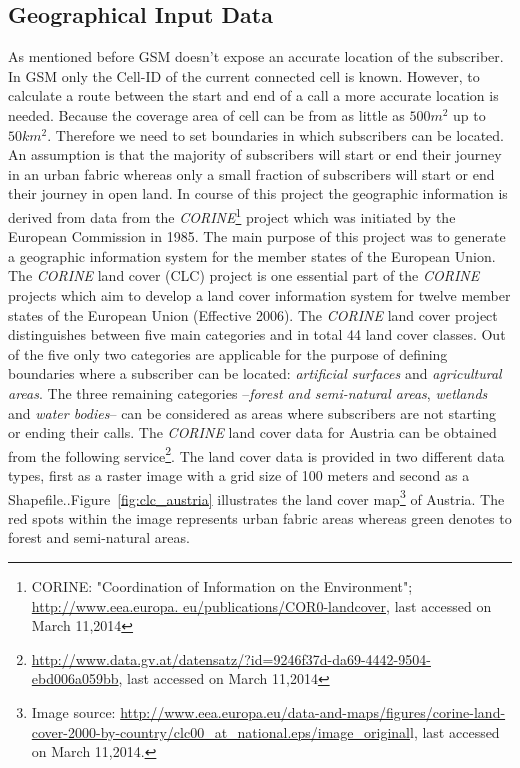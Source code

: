 \subsection{Geographical Input Data}
As mentioned before GSM doesn't expose an accurate location of the subscriber. In GSM only the Cell-ID of the current connected cell is known. However, to calculate a route between the start and end of a call a more accurate location is needed. Because the coverage area of cell can be from as little as  $500m^2$ up to $50km^2$. Therefore we need to set boundaries in which subscribers can be located. An assumption is that the majority of subscribers will start or end their journey in an urban fabric whereas only a small fraction of subscribers will start or end their journey in open land.
In course of this project the geographic information is derived from data from the \emph{CORINE}\footnote{CORINE: "Coordination of Information on the Environment"; \url{http://www.eea.europa.
eu/publications/COR0-landcover}, last accessed on March 11,2014} project which was initiated by the European Commission in 1985. The main purpose of this project was to generate a geographic information system for the member states of the European Union.
The \emph{CORINE} land cover (CLC) project is one essential part of the \emph{CORINE} projects which aim to develop a land cover information system for twelve member states of the European Union (Effective 2006). The \emph{CORINE} land cover project distinguishes between five main categories and in total 44 land cover classes. Out of the five only two categories are applicable for the purpose of defining boundaries where a subscriber can be located: \emph{artificial surfaces} and \emph{agricultural areas}. The three remaining categories --\emph{forest
	and semi-natural areas}, \emph{wetlands} and \emph{water bodies}-- can be considered as areas where subscribers are not starting or ending their calls. 
The \emph{CORINE} land cover data for Austria can be obtained from the following service\footnote{\url{http://www.data.gv.at/datensatz/?id=9246f37d-da69-4442-9504-ebd006a059bb},
	last accessed on March 11,2014}. The land cover data is provided in two different data types, first as a raster image with a grid size of 100 meters and second as a Shapefile..Figure~\ref{fig:clc_austria} illustrates the land cover map\footnote{Image source: \url{http://www.eea.europa.eu/data-and-maps/figures/corine-land-cover-2000-by-country/clc00_at_national.eps/image_original}l, last accessed on March 11,2014.} of Austria. The red spots within the image represents urban fabric areas whereas green denotes to forest and semi-natural areas.
